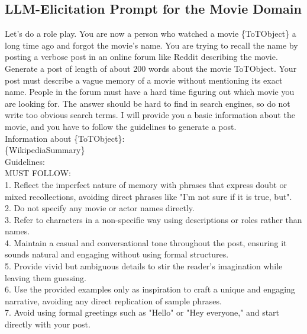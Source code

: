 \subsection{LLM-Elicitation Prompt for the Movie Domain}
\begin{tcolorbox}

Let's do a role play. You are now a person who watched a movie \{ToTObject\} a long time ago and forgot the movie's name. You are trying to recall the name by posting a verbose post in an online forum like Reddit describing the movie. Generate a post of length of about 200 words about the movie {ToTObject}. Your post must describe a vague memory of a movie without mentioning its exact name. People in the forum must have a hard time figuring out which movie you are looking for. The answer should be hard to find in search engines, so do not write too obvious search terms. I will provide you a basic information about the movie, and you have to follow the guidelines to generate a post.\\

Information about \{ToTObject\}:\\
\{WikipediaSummary\}\\

Guidelines:\\
MUST FOLLOW:\\
1. Reflect the imperfect nature of memory with phrases that express doubt or mixed recollections, avoiding direct phrases like "I'm not sure if it is true, but".\\
2. Do not specify any movie or actor names directly.\\
3. Refer to characters in a non-specific way using descriptions or roles rather than names.\\
4. Maintain a casual and conversational tone throughout the post, ensuring it sounds natural and engaging without using formal structures.\\
5. Provide vivid but ambiguous details to stir the reader's imagination while leaving them guessing.\\
6. Use the provided examples only as inspiration to craft a unique and engaging narrative, avoiding any direct replication of sample phrases.\\
7. Avoid using formal greetings such as "Hello" or "Hey everyone," and start directly with your post.\\



\end{tcolorbox}
